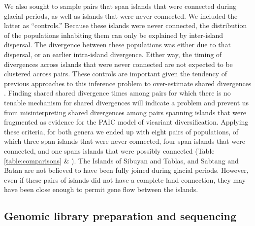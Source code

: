 We also sought to sample pairs that span islands that were connected during
glacial periods, as well as islands that were never connected.
We included the latter as ``controls.''
Because these islands were never connected, the distribution of the populations
inhabiting them can only be explained by inter-island dispersal.
The divergence between these populations was either due to that
dispersal, or an earlier intra-island divergence.
Either way, the timing of divergences across islands that were never connected
are not expected to be clustered across pairs.
These controls are important given the tendency of previous approaches to this
inference problem to over-estimate shared divergences
\citep{Oaks2012,Oaks2014reply}.
Finding shared shared divergence times among pairs for which there is no
tenable mechanism for shared divergences will indicate a problem and prevent us
from misinterpreting shared divergences among pairs spanning islands that were
fragmented as evidence for the PAIC model of vicariant diversification.
Applying these criteria, for both genera we ended up with eight pairs of
populations, of which three span islands that were never connected, four span
islands that were connected, and one spans islands that were possibly connected
(Table \ref{table:comparisons} \& ).
The Islands of Sibuyan and Tablas, and Sabtang and Batan are not believed to
have been fully joined during glacial periods.
However, even if these pairs of islands did not have a complete land
connection, they may have been close enough to permit gene flow between the
islands.

\subsection{Genomic library preparation and sequencing}

